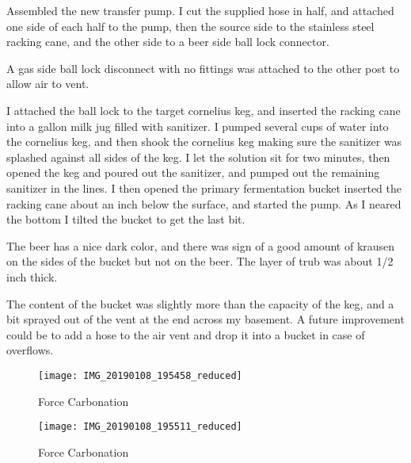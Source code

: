 \def\todaysdate{20190108}
\newday{\todaysdate}\label{\todaysdate}

\FloatBarrier{}

\begin{my_itemize}
    \item Assembled the new transfer pump.  I cut the supplied hose in half, and attached one side of each half to the pump, then the source side to the stainless steel racking cane, and the other side to a beer side ball lock connector.
    \item A gas side ball lock disconnect with no fittings was attached to the other post to allow air to vent.
    \item I attached the ball lock to the target cornelius keg, and inserted the racking cane into a gallon milk jug filled with sanitizer.  I pumped several cups of water into the cornelius keg, and then shook the cornelius keg making sure the sanitizer was splashed against all sides of the keg.  I let the solution sit for two minutes, then opened the keg and poured out the sanitizer, and pumped out the remaining sanitizer in the lines.  I then opened the primary fermentation bucket inserted the racking cane about an inch below the surface, and started the pump.  As I neared the bottom I tilted the bucket to get the last bit.
    \item The beer has a nice dark color, and there was sign of a good amount of krausen on the sides of the bucket but not on the beer.  The layer of trub was about 1/2 inch thick.
    \item The content of the bucket was slightly more than the capacity of the keg, and a bit sprayed out of the vent at the end across my basement.  A future improvement could be to add a hose to the air vent and drop it into a bucket in case of overflows.
\end{my_itemize}

\begin{figure}[H]
  \centering
  \texttt{[image: IMG\_20190108\_195458\_reduced]}
  \caption{Force Carbonation}\label{fig:racking:complete}
\end{figure}

\begin{figure}[H]
  \centering
  \texttt{[image: IMG\_20190108\_195511\_reduced]}
  \caption{Force Carbonation}\label{fig:racking:transferpump}
\end{figure}

